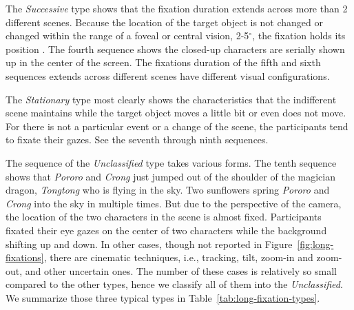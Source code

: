 \documentclass[oneside,master]{snueethesis}
\begin{document}
The \textit{Successive} type shows that the fixation duration extends across more than 2 different scenes. Because the location of the target object is not changed or changed within the range of a foveal or central vision, 2-5$^{\circ}$, the fixation holds its position \cite{mcmorris2014acquisition}. The fourth sequence shows the closed-up characters are serially shown up in the center of the screen. The fixations duration of the fifth and sixth sequences extends across different scenes have different visual configurations.

The \textit{Stationary} type most clearly shows the characteristics that the indifferent scene maintains while the target object moves a little bit or even does not move. For there is not a particular event or a change of the scene, the participants tend to fixate their gazes. See the seventh through ninth sequences.

The sequence of the \textit{Unclassified} type takes various forms. The tenth sequence shows that \textit{Pororo} and \textit{Crong} just jumped out of the shoulder of the magician dragon, \textit{Tongtong} who is flying in the sky. Two sunflowers spring \textit{Pororo} and \textit{Crong} into the sky in multiple times. But due to the perspective of the camera, the location of the two characters in the scene is almost fixed. Participants fixated their eye gazes on the center of two characters while the background shifting up and down. In other cases, though not reported in Figure~\ref{fig:long-fixations}, there are cinematic techniques, i.e., tracking, tilt, zoom-in and zoom-out, and other uncertain ones. The number of these cases is relatively so small compared to the other types, hence we classify all of them into the \textit{Unclassified}. We summarize those three typical types in Table~\ref{tab:long-fixation-types}.
\end{document}
